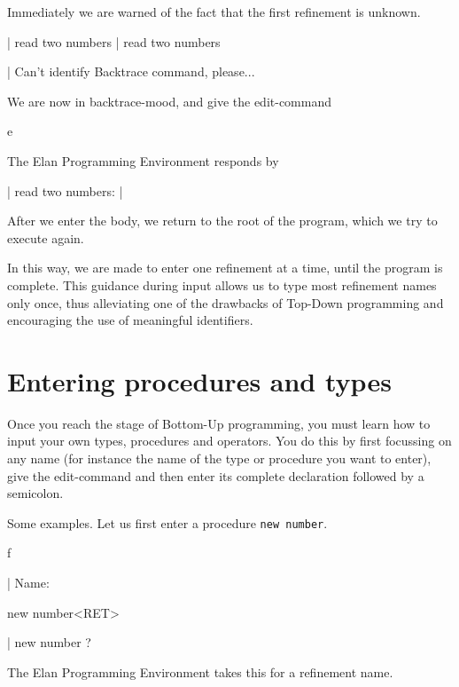 \noindent
Immediately we are warned of the fact that the first refinement is unknown.

\begin{elan}
|       read two numbers
|                               read two numbers\cursor

|       Can't identify          Backtrace command, please...
\end{elan}

\noindent
We are now in backtrace-mood, and give the edit-command

\begin{elan}
        e
\end{elan}

\noindent
The Elan Programming Environment responds by

\begin{elan}
|       read two numbers:
|       \cursor
\end{elan}

\noindent
After we enter the body, we return to the root of the program,
which we try to execute again.

In this way, we are made to enter one refinement at a time, until
the program is complete.
This guidance during input allows us to type most refinement names
only once, thus alleviating one of the drawbacks of Top-Down programming
and encouraging the use of meaningful identifiers.

\section{Entering procedures and types}

Once you reach the stage of Bottom-Up programming, you must learn how to
input your own types, procedures and operators. You do this by first
focussing on any name (for instance the name of the type or procedure you
want to enter), give the edit-command and then enter its complete
declaration followed by a semicolon.

Some examples. Let us first enter a procedure {\tt new number}.

\begin{elan}
        f

|       Name:\cursor

        new number<RET>

|       new number ?\cursor
\end{elan}

\noindent
The Elan Programming Environment takes this for a refinement name.

